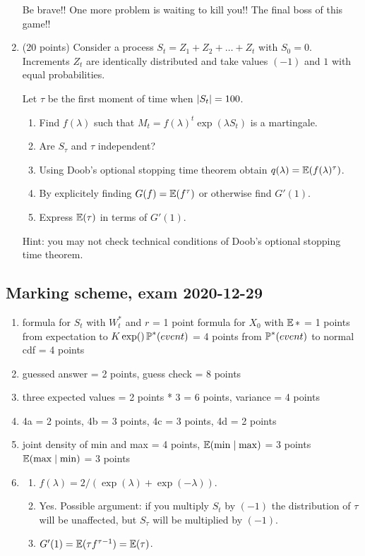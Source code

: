 \documentclass[12pt, a4paper]{article}
\DeclarePairedDelimiter{\abs}{\lvert}{\rvert}
\begin{document}
\begin{enumerate}
    Be brave!! One more problem is waiting to kill you!! The final boss of this game!!

    \item (20 points) Consider a process $S_t = Z_1 + Z_2 + \ldots + Z_t$ with $S_0=0$.
    Increments $Z_t$ are identically distributed and take values $(-1)$ and $1$ 
    with equal probabilities. 

    Let $\tau$ be the first moment of time when $\abs{S_t} = 100$.

    \begin{enumerate}
        \item Find $f(\lambda)$ such that $M_t = f(\lambda)^t\exp(\lambda S_t)$ is a martingale.
        \item Are $S_{\tau}$ and $\tau$ independent?
        \item Using Doob's optional stopping time theorem obtain $q(\lambda) = \E(f(\lambda)^{\tau})$.
        \item By explicitely finding $G(f) = \E(f^{\tau})$ or otherwise find $G'(1)$.
        \item Express $\E(\tau)$ in terms of $G'(1)$.
    \end{enumerate}

    Hint: you may not check technical conditions of Doob's optional stopping time theorem.
    
\end{enumerate}



\subsection{Marking scheme, exam 2020-12-29}


\begin{enumerate}
  \item formula for $S_t$ with $W_t^*$ and $r$ = 1 point
  formula for $X_0$ with $\E*$ = 1 points
  from expectation to $K\exp()\P^*(event)$ =  4 points
  from $\P^*(event)$ to normal cdf = 4 points
\item  guessed answer = 2 points, guess check = 8 points
\item three expected values = 2 points * 3 = 6 points, variance = 4 points
\item 4a = 2 points, 4b = 3 points, 4c = 3 points, 4d = 2 points

\item joint density of min and max = 4 points,
$\E(\min\mid \max)$ = 3 points
$\E(\max\mid \min)$ = 3 points 

\item \begin{enumerate}
  \item $f(\lambda) = 2/(\exp(\lambda) + \exp(-\lambda))$.
  \item Yes. Possible argument: if you multiply $S_t$ by $(-1)$ the distribution of $\tau$ will be unaffected, 
  but $S_{\tau}$ will be multiplied by $(-1)$. 
  \item $G'(1) = \E(\tau f^{\tau-1}) = \E(\tau)$.
\end{enumerate}
\end{enumerate}
\end{document}
